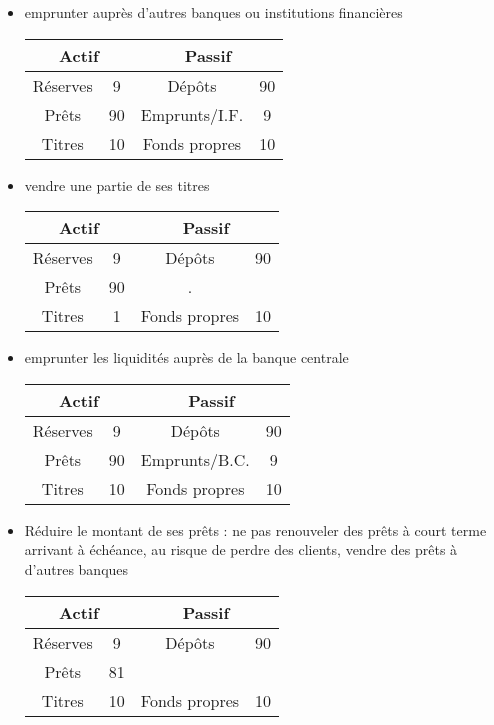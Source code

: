 	\begin{itemize}
		\item emprunter auprès d'autres banques ou institutions financières
		
\begin{center}
\begin{tabular}{|c|c|c|c|}
\hline 
\multicolumn{2}{|c|}{Actif} & \multicolumn{2}{|c|}{Passif} \\
\hline 
Réserves & 9 & Dépôts & 90 \\ 
\hline 
Prêts & 90 & Emprunts/I.F. & 9 \\ 
\hline 
Titres & 10 & Fonds propres & 10 \\ 
\hline 
\end{tabular} 
\end{center}		
				
		\item vendre une partie de ses titres
		
		\begin{center}
\begin{tabular}{|c|c|c|c|}
\hline 
\multicolumn{2}{|c|}{Actif} & \multicolumn{2}{|c|}{Passif} \\
\hline 
Réserves & 9 & Dépôts & 90 \\ 
\hline 
Prêts & 90 &  . &   \\ 
\hline 
Titres & 1 & Fonds propres & 10 \\ 
\hline 
\end{tabular} 
\end{center}

		\item emprunter les liquidités auprès de la banque centrale
		
\begin{center}
\begin{tabular}{|c|c|c|c|}
\hline 
\multicolumn{2}{|c|}{Actif} & \multicolumn{2}{|c|}{Passif} \\
\hline 
Réserves & 9 & Dépôts & 90 \\ 
\hline 
Prêts & 90 & Emprunts/B.C. & 9 \\ 
\hline 
Titres & 10 & Fonds propres & 10 \\ 
\hline 
\end{tabular} 
\end{center}		
		
		\item Réduire le montant de ses prêts : ne pas renouveler des prêts à court terme arrivant à échéance, au risque de perdre des clients, vendre des prêts 
à d'autres banques 

\begin{center}
\begin{tabular}{|c|c|c|c|}
\hline 
\multicolumn{2}{|c|}{Actif} & \multicolumn{2}{|c|}{Passif} \\
\hline 
Réserves & 9 & Dépôts & 90 \\ 
\hline 
Prêts & 81 &  &   \\ 
\hline 
Titres & 10 & Fonds propres & 10 \\ 
\hline 
\end{tabular} 
\end{center}
	\end{itemize}
	
